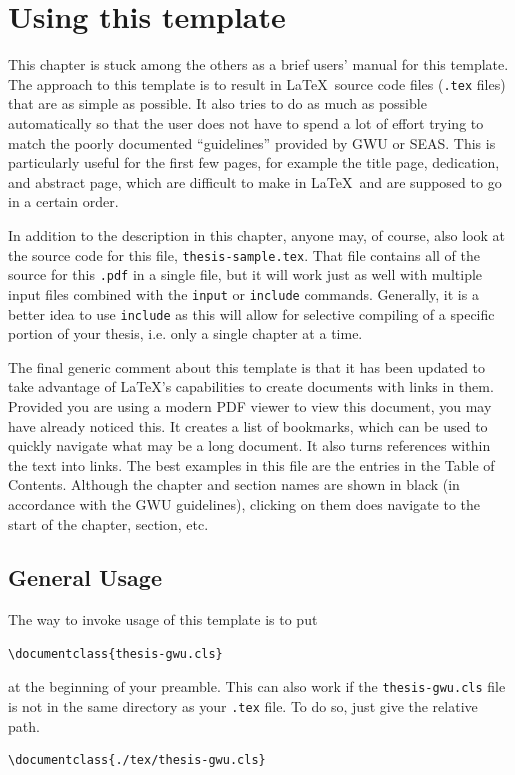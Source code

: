 \chapter{Using this template} \label{chap:intro}

This chapter is stuck among the others as a brief users' manual for this template.  
The approach to this template is to result in \LaTeX~source code files (\texttt{.tex} files) that are as simple as possible.  
It also tries to do as much as possible automatically so that the user does not have to spend a lot of effort trying to match the poorly documented ``guidelines'' provided by GWU or SEAS. 
This is particularly useful for the first few pages, for example the title page, dedication, and abstract page, which are difficult to make in \LaTeX~and are supposed to go in a certain order.

In addition to the description in this chapter, anyone may, of course, also look at the source code for this file, \texttt{thesis-sample.tex}.
That file contains all of the source for this \texttt{.pdf} in a single file, but it will work just as well with multiple input files combined with the \texttt{input} or \texttt{include} commands.
Generally, it is a better idea to use \texttt{include} as this will allow for selective compiling of a specific portion of your thesis, i.e. only a single chapter at a time.

The final generic comment about this template is that it has been updated to take advantage of \LaTeX's capabilities to create documents with links in them.  
Provided you are using a modern PDF viewer to view this document, you may have already noticed this.  
It creates a list of bookmarks, which can be used to quickly navigate what may be a long document.  
It also turns references within the text into links.  
The best examples in this file are the entries in the Table of Contents.
Although the chapter and section names are shown in black (in accordance with the GWU guidelines), clicking on them does navigate to the start of the chapter, section, etc.


\section{General Usage}
The way to invoke usage of this template is to put
\begin{verbatim}
\documentclass{thesis-gwu.cls}
\end{verbatim}
at the beginning of your preamble.  
This can also work if the \texttt{thesis-gwu.cls} file is not in the same directory as your \texttt{.tex} file.  
To do so, just give the relative path.
\begin{verbatim}
\documentclass{./tex/thesis-gwu.cls}
\end{verbatim}

